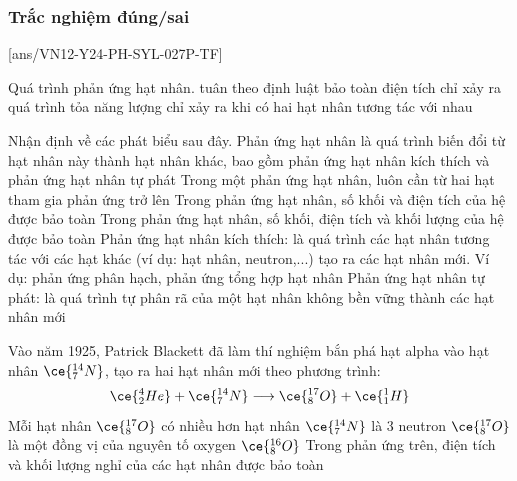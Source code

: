 \subsubsection{Trắc nghiệm đúng/sai}
\setcounter{ex}{0}
[ans/VN12-Y24-PH-SYL-027P-TF]
\begin{ex}
	Quá trình phản ứng hạt nhân.
	{\True tuân theo định luật bảo toàn điện tích}
	{chỉ xảy ra quá trình tỏa năng lượng}
	{chỉ xảy ra khi có hai hạt nhân tương tác với nhau}
\end{ex}
\begin{ex}
	Nhận định về các phát biểu sau đây.
	\choiceTFt
	{\True Phản ứng hạt nhân là quá trình biến đổi từ hạt nhân này thành hạt nhân khác, bao gồm phản ứng hạt nhân kích thích và phản ứng hạt nhân tự phát}
	{Trong một phản ứng hạt nhân, luôn cần từ hai hạt tham gia phản ứng trở lên}
	{\True Trong phản ứng hạt nhân, số khối và điện tích của hệ được	bảo toàn}
	{Trong phản ứng hạt nhân, số khối, điện tích và khối lượng của hệ được bảo toàn}
	{\True Phản ứng hạt nhân kích thích: là quá trình các hạt nhân tương tác với các hạt khác (ví dụ: hạt nhân, neutron,...) tạo ra các hạt nhân mới. Ví dụ: phản ứng phân hạch, phản ứng tổng hợp hạt nhân}
	{\True Phản ứng hạt nhân tự phát: là quá trình tự phân rã của một hạt nhân không bền vững thành các hạt nhân mới}
	\loigiai{}
\end{ex}
\begin{ex}
	Vào năm 1925, Patrick Blackett đã làm thí nghiệm bắn phá hạt alpha vào hạt nhân $\ce{^{14}_7N}$, tạo ra hai hạt nhân mới theo phương trình:
	$$\ce{^4_2He}+\ce{^{14}_7N}\longrightarrow\ce{^{17}_8O}+\ce{^1_1H}$$
	{Mỗi hạt nhân $\ce{^{17}_8O}$ có nhiều hơn hạt nhân $\ce{^{14}_7N}$ là 3 neutron}
	{\True $\ce{^{17}_8O}$ là một đồng vị của nguyên tố oxygen $\ce{^{16}_8O}$}
	{Trong phản ứng trên, điện tích và khối lượng nghỉ của các hạt nhân được bảo toàn}
	\loigiai{}
\end{ex}
